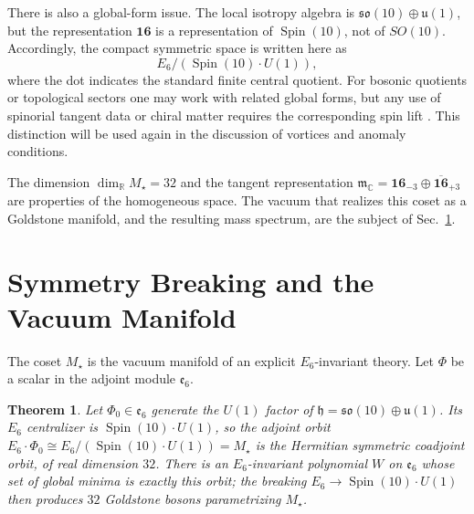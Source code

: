 \documentclass[aps,prd,preprint,longbibliography,nofootinbib,superscriptaddress,floatfix]{revtex4-2}
\newtheorem{theorem}{Theorem}[section]
\newcommand{\Spin}{\operatorname{Spin}}
\begin{document}
There is also a global-form issue. The local isotropy algebra is
\(\mathfrak{so}(10)\oplus\mathfrak u(1)\), but the representation
\(\mathbf{16}\) is a representation of \(\Spin(10)\), not of \(SO(10)\).
Accordingly, the compact symmetric space is written here as
\begin{equation}
    E_6/(\Spin(10)\cdot U(1)),
    \label{eq:eiii_spin_form}
\end{equation}
where the dot indicates the standard finite central quotient. For bosonic
quotients or topological sectors one may work with related global forms, but
any use of spinorial tangent data or chiral matter requires the corresponding
spin lift \cite{LawsonMichelsohn,Nakahara}. This distinction will be used again
in the discussion of vortices and anomaly conditions.

The dimension \(\dim_{\mathbb R}M_\star=32\) and the tangent representation
\(\mathfrak m_{\mathbb C}=\mathbf{16}_{-3}\oplus\overline{\mathbf{16}}_{+3}\)
are properties of the homogeneous space. The vacuum that realizes this coset as
a Goldstone manifold, and the resulting mass spectrum, are the subject of
Sec.~\ref{sec:soldered_vacua}.


\section{Symmetry Breaking and the Vacuum Manifold}
\label{sec:soldered_vacua}

The coset \(M_\star\) is the vacuum manifold of an explicit \(E_6\)-invariant
theory. Let \(\Phi\) be a scalar in the adjoint module \(\mathfrak e_6\).

\begin{theorem}
\label{thm:vacuum_orbit}
Let \(\Phi_0\in\mathfrak e_6\) generate the \(U(1)\) factor of
\(\mathfrak h=\mathfrak{so}(10)\oplus\mathfrak u(1)\). Its \(E_6\) centralizer is
\(\Spin(10)\cdot U(1)\), so the adjoint orbit
\(E_6\cdot\Phi_0\cong E_6/(\Spin(10)\cdot U(1))=M_\star\) is the Hermitian
symmetric coadjoint orbit, of real dimension \(32\). There is an
\(E_6\)-invariant polynomial \(W\) on \(\mathfrak e_6\) whose set of global
minima is exactly this orbit; the breaking \(E_6\to\Spin(10)\cdot U(1)\) then
produces \(32\) Goldstone bosons parametrizing \(M_\star\).
\end{theorem}
\end{document}
